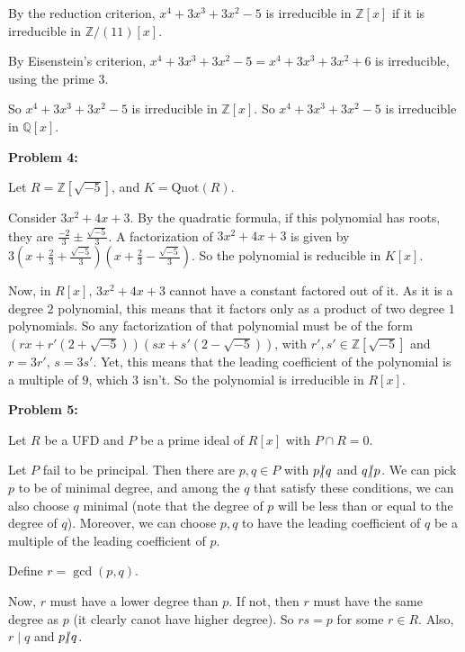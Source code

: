 \documentclass[a4paper,12pt]{article}
\newcommand{\shunt}{\vspace{20mm}}
\newcommand{\Q}{\mathbb{Q}}
\newcommand{\Z}{\mathbb{Z}}
\begin{document}
By the reduction criterion, $x^4 + 3x^3 + 3x^2 -5$ is irreducible in $\Z[x]$ if it is irreducible in $\Z/(11)[x]$.

By Eisenstein's criterion, $x^4 + 3x^3 + 3x^2 -5 = x^4 + 3x^3 + 3x^2 +6$ is irreducible, using the prime $3$.

So $x^4 + 3x^3 + 3x^2 -5$ is irreducible in $\Z[x]$. So $x^4 + 3x^3 + 3x^2 -5$ is irreducible in $\Q[x]$.

\shunt

{\bf Problem 4:} 

Let $R = \Z[\sqrt{-5}]$, and $K = \text{Quot}(R)$. 

Consider $3x^2 + 4x + 3$. By the quadratic formula, if this polynomial has roots, they are $\frac{-2}{3} \pm \frac{\sqrt{-5}}{3}$. A factorization of $3x^2 + 4x + 3$ is given by $3(x+\frac{2}{3} + \frac{\sqrt{-5}}{3})(x+\frac{2}{3} - \frac{\sqrt{-5}}{3})$. So the polynomial is reducible in $K[x]$.

Now, in $R[x]$, $3x^2 + 4x + 3$ cannot have a constant factored out of it. As it is a degree $2$ polynomial, this means that it factors only as a product of two degree $1$ polynomials. So any factorization of that polynomial must be of the form $(rx+r'(2 +\sqrt{-5}))(sx+s'(2 -\sqrt{-5}))$, with $r',s' \in \Z[\sqrt{-5}]$ and $r=3r'$, $s=3s'$. Yet, this means that the leading coefficient of the polynomial is a multiple of $9$, which $3$ isn't. So the polynomial is irreducible in $R[x]$.

\shunt

{\bf Problem 5:} 

Let $R$ be a UFD and $P$ be a prime ideal of $R[x]$ with $P \cap R = 0$.

Let $P$ fail to be principal. Then there are $p,q \in P$ with $p \slashed{\mid} q$ and $q \slashed{\mid} p$. We can pick $p$ to be of minimal degree, and among the $q$ that satisfy these conditions, we can also choose $q$ minimal (note that the degree of $p$ will be less than or equal to the degree of $q$). Moreover, we can choose $p,q$ to have the leading coefficient of $q$ be a multiple of the leading coefficient of $p$. 

Define $r = \gcd(p,q)$. 

Now, $r$ must have a lower degree than $p$. If not, then $r$ must have the same degree as $p$ (it clearly canot have higher degree). So $rs=p$ for some $r \in R$. Also, $r \mid q$ and $p \slashed{\mid} q$. %



\shunt
\end{document}
